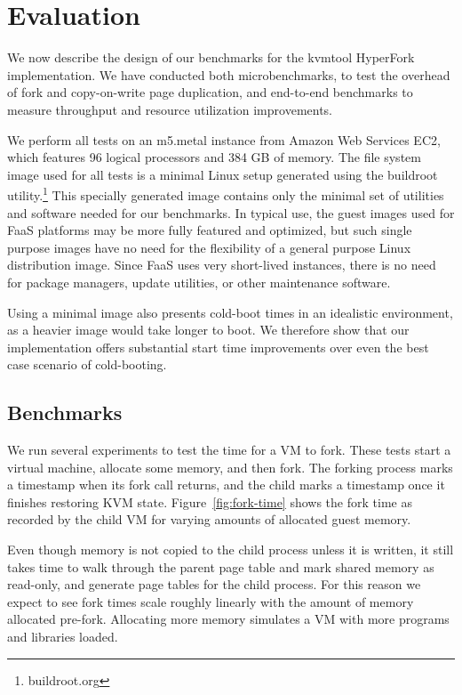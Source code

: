 \section{Evaluation} \label{sec:experiments} We now describe the
design of our benchmarks for the kvmtool HyperFork implementation. We have
conducted both microbenchmarks, to test the overhead of fork and copy-on-write
page duplication, and end-to-end benchmarks to measure throughput and resource
utilization improvements.

We perform all tests on an m5.metal instance from Amazon Web Services EC2,
which features 96 logical processors and 384 GB of memory. The file system
image used for all tests is a minimal Linux setup generated using the buildroot
utility.\footnote{buildroot.org} This specially generated image contains only
the minimal set of utilities and software needed for our benchmarks. In typical
use, the guest images used for FaaS platforms may be more fully featured and
optimized, but such single purpose images have no need for the flexibility of a
general purpose Linux distribution image. Since FaaS uses very short-lived
instances, there is no need for package managers, update utilities, or other
maintenance software.

Using a minimal image also presents cold-boot times in an idealistic
environment, as a heavier image would take longer to boot. We therefore show
that our implementation offers substantial start time improvements over even
the best case scenario of cold-booting.

\subsection{Benchmarks}


We run several experiments to test the time for a VM to fork. These tests start
a virtual machine, allocate some memory, and then fork.  The forking process
marks a timestamp when its fork call returns, and the child marks a timestamp
once it finishes restoring KVM state.  Figure~\ref{fig:fork-time} shows the
fork time as recorded by the child VM for varying amounts of allocated guest
memory.

Even though memory is not copied to the child process unless it is written, it
still takes time to walk through the parent page table and mark shared memory
as read-only, and generate page tables for the child process. For this reason
we expect to see fork times scale roughly linearly with the amount of memory
allocated pre-fork. Allocating more memory simulates a VM with more programs
and libraries loaded.

